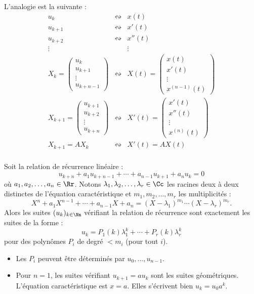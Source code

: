 \documentclass[12pt, class=report,crop=false]{standalone}
\begin{document}
L'analogie est la suivante :
$$\begin{array}{ccc}
u_k & \leftrightsquigarrow & x(t) \\
u_{k+1} & \leftrightsquigarrow & x'(t) \\
u_{k+2} & \leftrightsquigarrow & x''(t) \\
\vdots  & & \vdots \\
X_k = \begin{pmatrix}u_k\\u_{k+1}\\\vdots\\u_{k+n-1}\end{pmatrix} & \leftrightsquigarrow & 
X(t)  = \begin{pmatrix} x(t) \\ x'(t) \\ \vdots \\ x^{(n-1)}(t) \end{pmatrix}\\
X_{k+1} = \begin{pmatrix}u_{k+1}\\u_{k+2}\\\vdots\\u_{k+n}\end{pmatrix} & \leftrightsquigarrow & X'(t) =\begin{pmatrix} x'(t) \\ x''(t) \\  \vdots \\ x^{(n)}(t) \end{pmatrix} \\
X_{k+1} = A X_k & \leftrightsquigarrow & X'(t)=AX(t) \\
\end{array}$$

\begin{theoreme}
Soit la relation de récurrence linéaire :
$$u_{k+n} + a_1 u_{k+n-1}+ \cdots+ a_{n-1}u_{k+1} +a_n u_k=0$$
où $a_1,a_2,\ldots,a_n \in \Rr$.
Notons $\lambda_1, \lambda_2,\ldots,\lambda_r \in \Cc$ les racines deux à deux distinctes de l'équation 
caractéristique et $m_1,m_2,\ldots,m_r$ les multiplicités :
\[X^n+a_1X^{n-1}+ \cdots +a_{n-1}X+a_n = (X-\lambda_1)^{m_1}\cdots(X-\lambda_r)^{m_r}.\]
Alors les suites $(u_k)_{k\in\Nn}$ vérifiant la relation de récurrence sont exactement les suites de la forme :
\[ u_k = P_1(k) \lambda_1^k + \cdots + P_r(k) \lambda_r^k \]
pour des polynômes $P_i$ de degré $< m_i$ (pour tout $i$).
\end{theoreme}


\begin{remarque*}
\sauteligne
\begin{itemize}
  \item Les $P_i$ peuvent être déterminés par $u_0,\ldots,u_{n-1}$.
  \item Pour $n=1$, les suites vérifiant $u_{k+1} = a u_k$ sont les suites géométriques.
  L'équation caractéristique est $x=a$. Elles s'écrivent bien $u_k = u_0 a^k$.
\end{itemize}
\end{remarque*}
\end{document}
